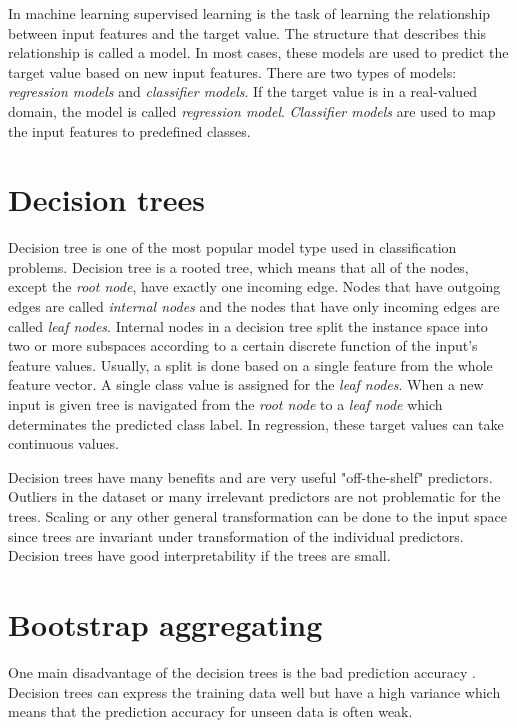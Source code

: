 In machine learning supervised learning is the task of learning the relationship between input features and the target value. The structure that describes this relationship is called a model. In most cases, these models are used to predict the target value based on new input features. There are two types of models: \textit{regression models} and \textit{classifier models}. If the target value is in a real-valued domain, the model is called \textit{regression model}. \textit{Classifier models} are used to map the input features to predefined classes. \cite{rokach2005top}

\section{Decision trees}
Decision tree is one of the most popular model type used in classification problems. Decision tree is a rooted tree, which means that all of the nodes, except the \textit{root node}, have exactly one incoming edge. Nodes that have outgoing edges are called \textit{internal nodes} and the nodes that have only incoming edges are called \textit{leaf nodes}. Internal nodes in a decision tree split the instance space into two or more subspaces according to a certain discrete function of the input's feature values. Usually, a split is done based on a single feature from the whole feature vector. A single class value is assigned for the \textit{leaf nodes}. When a new input is given tree is navigated from the \textit{root node} to a \textit{leaf node} which determinates the predicted class label. In regression, these target values can take continuous values. \cite{rokach2005top}

Decision trees have many benefits and are very useful "off-the-shelf" predictors. Outliers in the dataset or many irrelevant predictors are not problematic for the trees. Scaling or any other general transformation can be done to the input space since trees are invariant under transformation of the individual predictors. \cite{friedman2001elements} Decision trees have good interpretability if the trees are small.

\section{Bootstrap aggregating}
One main disadvantage of the decision trees is the bad prediction accuracy \cite{friedman2001elements}. Decision trees can express the training data well but have a high variance which means that the prediction accuracy for unseen data is often weak.

